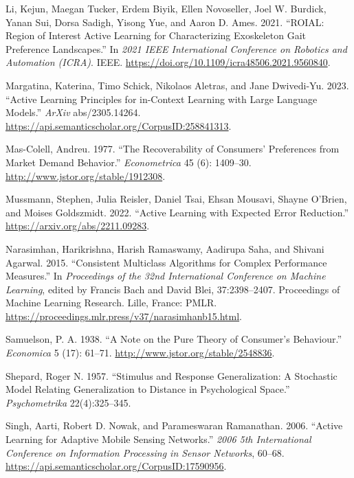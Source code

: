 \documentclass[
  letterpaper,
  numbers=noenddot,
  DIV=11]{scrreprt}
\newlength{\cslhangindent}
\newenvironment{CSLReferences}[2] %
 {\begin{list}{}{%
  \setlength{\itemindent}{0pt}
  \setlength{\leftmargin}{0pt}
  \setlength{\parsep}{0pt}
  \ifodd #1
   \setlength{\leftmargin}{\cslhangindent}
   \setlength{\itemindent}{-1\cslhangindent}
  \fi
  \setlength{\itemsep}{#2\baselineskip}}}
 {\end{list}}
\theoremstyle{plain}
\theoremstyle{definition}
\theoremstyle{remark}
\begin{document}
\begin{CSLReferences}{1}{0}
Li, Kejun, Maegan Tucker, Erdem Biyik, Ellen Novoseller, Joel W.
Burdick, Yanan Sui, Dorsa Sadigh, Yisong Yue, and Aaron D. Ames. 2021.
{``ROIAL: Region of Interest Active Learning for Characterizing
Exoskeleton Gait Preference Landscapes.''} In \emph{2021 IEEE
International Conference on Robotics and Automation (ICRA)}. IEEE.
\url{https://doi.org/10.1109/icra48506.2021.9560840}.

Margatina, Katerina, Timo Schick, Nikolaos Aletras, and Jane Dwivedi-Yu.
2023. {``Active Learning Principles for in-Context Learning with Large
Language Models.''} \emph{ArXiv} abs/2305.14264.
\url{https://api.semanticscholar.org/CorpusID:258841313}.

Mas-Colell, Andreu. 1977. {``The Recoverability of Consumers'
Preferences from Market Demand Behavior.''} \emph{Econometrica} 45 (6):
1409--30. \url{http://www.jstor.org/stable/1912308}.

Mussmann, Stephen, Julia Reisler, Daniel Tsai, Ehsan Mousavi, Shayne
O'Brien, and Moises Goldszmidt. 2022. {``Active Learning with Expected
Error Reduction.''} \url{https://arxiv.org/abs/2211.09283}.

Narasimhan, Harikrishna, Harish Ramaswamy, Aadirupa Saha, and Shivani
Agarwal. 2015. {``Consistent Multiclass Algorithms for Complex
Performance Measures.''} In \emph{Proceedings of the 32nd International
Conference on Machine Learning}, edited by Francis Bach and David Blei,
37:2398--2407. Proceedings of Machine Learning Research. Lille, France:
PMLR. \url{https://proceedings.mlr.press/v37/narasimhanb15.html}.

Samuelson, P. A. 1938. {``A Note on the Pure Theory of Consumer's
Behaviour.''} \emph{Economica} 5 (17): 61--71.
\url{http://www.jstor.org/stable/2548836}.

Shepard, Roger N. 1957. {``Stimulus and Response Generalization: A
Stochastic Model Relating Generalization to Distance in Psychological
Space.''} \emph{Psychometrika} 22(4):325--345.

Singh, Aarti, Robert D. Nowak, and Parameswaran Ramanathan. 2006.
{``Active Learning for Adaptive Mobile Sensing Networks.''} \emph{2006
5th International Conference on Information Processing in Sensor
Networks}, 60--68.
\url{https://api.semanticscholar.org/CorpusID:17590956}.


\end{CSLReferences}
\end{document}
